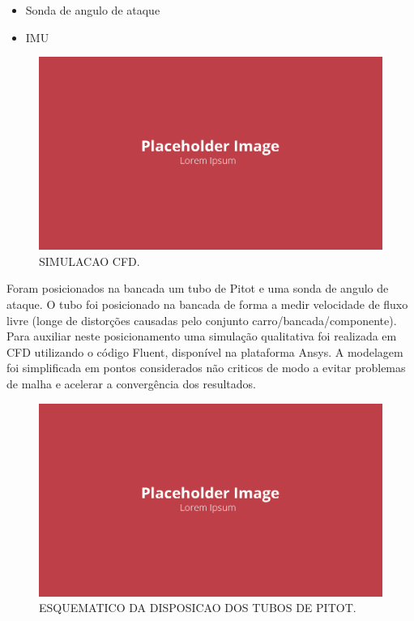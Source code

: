 \begin{itemize}
    \item Sonda de angulo de ataque
    \item IMU
\end{itemize}

\begin{figure}[!ht]
    \centering
    \includegraphics[width=.8\linewidth]{figuras/outras/placeholder.png}
    \caption{SIMULACAO CFD\cite{autor}.}
    \label{fig:placeholder}
\end{figure}

Foram posicionados na bancada um tubo de Pitot e uma sonda de angulo de ataque. O tubo foi posicionado na bancada de forma a medir velocidade de fluxo livre (longe de distorções causadas pelo conjunto carro/bancada/componente). Para auxiliar neste posicionamento uma simulação qualitativa foi realizada em CFD utilizando o código Fluent, disponível na plataforma Ansys. A modelagem foi simplificada em pontos considerados não criticos de modo a evitar problemas de malha e acelerar a convergência dos resultados.

\begin{figure}[!ht]
    \centering
    \includegraphics[width=.8\linewidth]{figuras/outras/placeholder.png}
    \caption{ESQUEMATICO DA DISPOSICAO DOS TUBOS DE PITOT\cite{autor}.}
    \label{fig:placeholder}
\end{figure}


